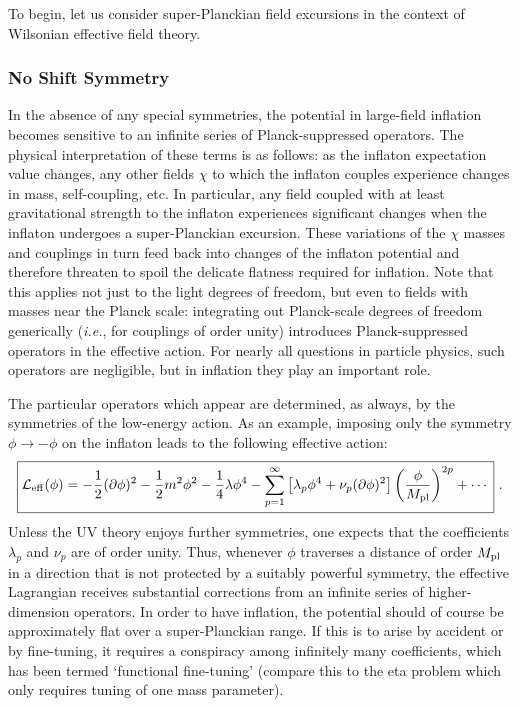 \documentclass[12pt,letterpaper,rotate]{article}
\def\beq{\begin{equation}}
\def\eeq{\end{equation}}
\begin{document}
{To begin, let us consider super-Planckian field excursions in the context of Wilsonian effective field theory.

\subsubsection{No Shift Symmetry}

In the absence of any special symmetries, the potential in large-field inflation becomes sensitive to
an infinite series of Planck-suppressed operators.
The physical interpretation of these terms is as follows: as the inflaton
expectation value changes, any other fields $\chi$ to which the inflaton couples experience changes in mass, self-coupling, etc.
In particular,
any field coupled with at least gravitational strength to the inflaton experiences significant changes when the inflaton undergoes a super-Planckian excursion.  
These variations of the $\chi$ masses and couplings in turn feed back into changes of the inflaton potential and therefore threaten to spoil the delicate flatness required for inflation.
Note that this applies not just to the light degrees of freedom, but even to fields with masses near the Planck scale: integrating out Planck-scale degrees of freedom generically ({\it i.e.}, for couplings of order unity) introduces Planck-suppressed operators in the effective action.  For nearly all questions in particle physics,  such operators are negligible, but in inflation they play an important role.

The particular operators which appear are determined, as always, by the symmetries of the low-energy action.  As an example, imposing only the symmetry $\phi \to - \phi$ on the inflaton leads to the following effective action:
\beq
\fbox{$\displaystyle
{\cal L}_{\rm eff}(\phi) = -\frac{1}{2}(\partial \phi)^2 - \frac{1}{2} m^2 \phi^2 - \frac{1}{4} \lambda \phi^4 - \sum_{p=1}^\infty \left[ \lambda_p \phi^4  + \nu_p (\partial \phi)^2    \right] \left( \frac{\phi}{M_{\rm pl}} \right)^{2p}+ \cdots $}\ .
\eeq
Unless the UV theory enjoys further symmetries,
one expects that the coefficients $\lambda_p$ and $\nu_p$ are of order unity.
Thus, whenever $\phi$ traverses a distance of order $M_{\rm pl}$ in a direction that is not protected by a suitably powerful symmetry, the effective Lagrangian receives substantial corrections from an infinite series of
higher-dimension operators.
In order to have inflation, the potential should of course be approximately flat over a super-Planckian range.  If this is to arise by accident or by fine-tuning, it requires a conspiracy among infinitely many coefficients, which has been termed `functional fine-tuning'
(compare this to the eta problem which only requires tuning of one mass parameter).


}
\end{document}
